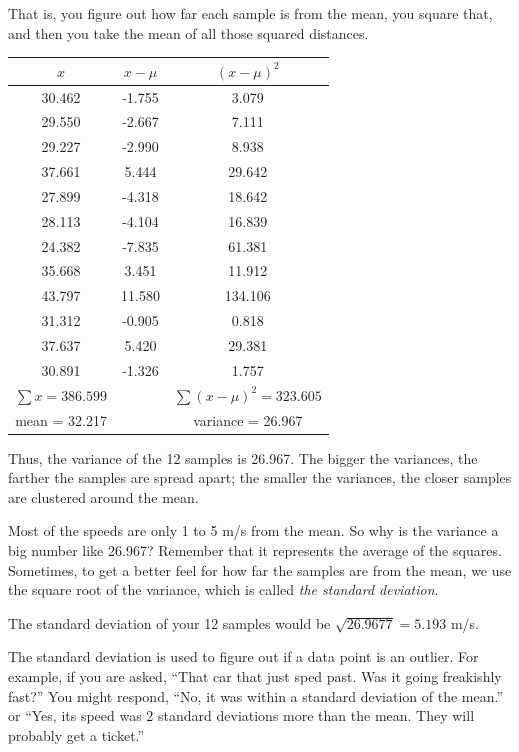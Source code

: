 That is, you figure out how far each sample is from the mean, you
square that, and then you take the mean of all those squared
distances.

\begin{tabular} {c | c | c}

  $x$ & $x - \mu$ & $(x - \mu)^2$\\
  \hline
30.462 & -1.755 & 3.079 \\
29.550 & -2.667 & 7.111\\
29.227 & -2.990 & 8.938\\
37.661 & 5.444 & 29.642\\
27.899 & -4.318 & 18.642\\
28.113 & -4.104 & 16.839 \\
24.382 & -7.835 & 61.381 \\
35.668 & 3.451 & 11.912 \\
43.797 & 11.580 & 134.106\\
31.312 & -0.905 & 0.818\\
37.637 & 5.420 & 29.381\\
30.891 & -1.326 & 1.757\\
\hline
$\sum x = 386.599$ & & $\sum (x - \mu)^2 = 323.605$\\
mean = 32.217 & & variance = 26.967
\end{tabular}

Thus, the variance of the 12 samples is 26.967. The bigger the variances, 
the farther the samples are spread apart; the smaller the variances, the closer
samples are clustered around the mean.

Most of the speeds are only 1 to 5 m/s from the mean. So why is the variance a big number like 26.967?
Remember that it represents the average of the squares. Sometimes, to
get a better feel for how far the samples are from the mean, we use
the square root of the variance, which is called \textit{the standard
  deviation}.

The standard deviation of your 12 samples would be $\sqrt{26.9677} =
  5.193$ m/s.

The standard deviation is used to figure out if a data point is an
outlier. For example, if you are asked, ``That car that just sped
past. Was it going freakishly fast?'' You might respond, ``No, it was
within a standard deviation of the mean.'' or ``Yes, its speed was 2
standard deviations more than the mean. They will probably get a ticket.''

